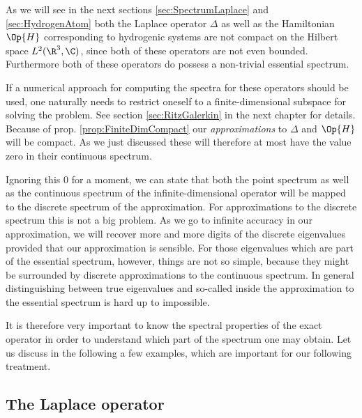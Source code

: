 \begin{rem}
As we will see in the next sections \vref{sec:SpectrumLaplace}
and \vref{sec:HydrogenAtom} both the Laplace operator $\Delta$ as well as the
Hamiltonian $\Op{H}$ corresponding to hydrogenic systems
are not compact on the Hilbert space $L^2(\R^3, \C)$,
since both of these operators are not even bounded.
Furthermore both of these operators do possess a non-trivial essential spectrum.

If a numerical approach for computing the spectra for these operators
should be used,
one naturally needs to restrict oneself to a finite-dimensional subspace
for solving the problem.
See section \vref{sec:RitzGalerkin} in the next chapter for details.
Because of prop. \vref{prop:FiniteDimCompact} our \emph{approximations}
to $\Delta$ and $\Op{H}$ will be compact.
As we just discussed these will therefore
at most have the value zero in their continuous spectrum.

Ignoring this $0$ for a moment,
we can state that
both the point spectrum as well as the continuous spectrum
of the infinite-dimensional operator will be mapped to the discrete
spectrum of the approximation.
For approximations to the discrete spectrum this is not a big problem.
As we go to infinite accuracy in our approximation,
we will recover more and more digits of the discrete eigenvalues
provided that our approximation is sensible.
For those eigenvalues which are part of the essential spectrum, however,
things are not so simple, because they might be surrounded by
discrete approximations to the continuous spectrum.
In general distinguishing between true eigenvalues
and so-called  inside the approximation
to the essential spectrum is hard up to impossible.
\end{rem}

It is therefore very important to know
the spectral properties of the exact operator
in order to understand which part of the spectrum one may obtain.
Let us discuss in the following a few examples,
which are important for our following treatment.

\subsection{The Laplace operator}
\label{sec:SpectrumLaplace}




